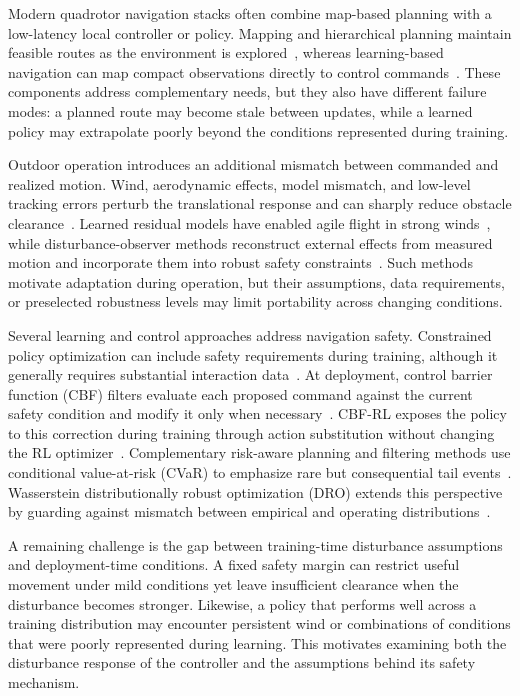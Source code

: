 Modern quadrotor navigation stacks often combine map-based planning with a low-latency local controller or policy. Mapping and hierarchical planning maintain feasible routes as the environment is explored~\cite{zhou2021fuel}, whereas learning-based navigation can map compact observations directly to control commands~\cite{bouhamed2020ddpg,kaufmann2023champion}. These components address complementary needs, but they also have different failure modes: a planned route may become stale between updates, while a learned policy may extrapolate poorly beyond the conditions represented during training.

Outdoor operation introduces an additional mismatch between commanded and realized motion. Wind, aerodynamic effects, model mismatch, and low-level tracking errors perturb the translational response and can sharply reduce obstacle clearance~\cite{faessler2018drag}. Learned residual models have enabled agile flight in strong winds~\cite{litNeuralFly2022}, while disturbance-observer methods reconstruct external effects from measured motion and incorporate them into robust safety constraints~\cite{wang2023dobcbf,kalaria2024dobcbfrl}. Such methods motivate adaptation during operation, but their assumptions, data requirements, or preselected robustness levels may limit portability across changing conditions.

Several learning and control approaches address navigation safety. Constrained policy optimization can include safety requirements during training, although it generally requires substantial interaction data~\cite{litSafePrimalDual2023}. At deployment, control barrier function (CBF) filters evaluate each proposed command against the current safety condition and modify it only when necessary~\cite{litAmes2017,litAmes2019}. CBF-RL exposes the policy to this correction during training through action substitution without changing the RL optimizer~\cite{litCBFRL2026}. Complementary risk-aware planning and filtering methods use conditional value-at-risk (CVaR) to emphasize rare but consequential tail events~\cite{rockafellar2000cvar,hakobyan2022wasserstein,safaoui2024drcvar,chriat2024wcvarcbf}. Wasserstein distributionally robust optimization (DRO) extends this perspective by guarding against mismatch between empirical and operating distributions~\cite{thEsfahani2018,long2024sensor,mandaokar2026druav}. 

A remaining challenge is the gap between training-time disturbance assumptions and deployment-time conditions. A fixed safety margin can restrict useful movement under mild conditions yet leave insufficient clearance when the disturbance becomes stronger. Likewise, a policy that performs well across a training distribution may encounter persistent wind or combinations of conditions that were poorly represented during learning. This motivates examining both the disturbance response of the controller and the assumptions behind its safety mechanism.

